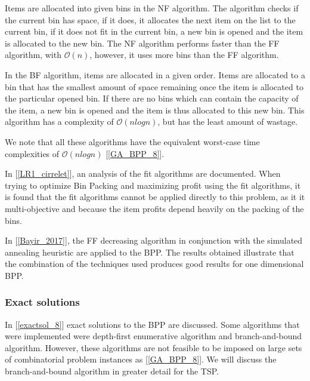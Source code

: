 \begin{flushleft}
Items are allocated into given bins in the NF algorithm. The algorithm  checks if the current bin has space, if it does, it allocates the next item on the list to the current bin, if it does not fit in the current bin, a new bin is opened and the item is allocated to the new bin. The NF algorithm performs faster than the FF algorithm, with $\mathcal{O}(n)$, however, it uses more bins than the FF algorithm. 
\end{flushleft}

\begin{flushleft}
In the BF algorithm, items are allocated in a given order. Items are allocated to a bin that has the smallest amount of space remaining once the item is allocated to the particular opened bin. If there are no bins which can contain the capacity of the item, a new bin is opened and the item is thus allocated to this new bin. This algorithm has a complexity of $\mathcal{O}(nlogn)$, but has the least amount of wastage. 
\end{flushleft}

\begin{flushleft}
We note that all these algorithms have the equivalent worst-case time complexities of $\mathcal{O}(nlogn)$ [\ref{GA_BPP_8}].
\end{flushleft}
\begin{flushleft}
In [\ref{LR1_cirrelet}],  an analysis of the fit algorithms are documented. When trying to optimize Bin Packing and maximizing profit using the fit algorithms, it is found that the fit algorithms cannot be applied directly to this problem, as it it multi-objective and because the item profits depend heavily on the packing of the bins. 
\end{flushleft}

\begin{flushleft}
In [\ref{Bayir_2017}],  the FF decreasing algorithm in conjunction with the simulated annealing heuristic are applied to the BPP. The results obtained illustrate that the combination of the techniques used produces good results for one dimensional BPP.
\end{flushleft}

\subsubsection{Exact solutions}
In [\ref{exactsol_8}] exact solutions to the BPP are discussed. Some algorithms that were implemented were depth-first enumerative algorithm and branch-and-bound algorithm. However, these algorithms are not feasible to be imposed on large sets of combinatorial problem instances as  [\ref{GA_BPP_8}]. We will discuss the branch-and-bound algorithm in greater detail for the TSP.
